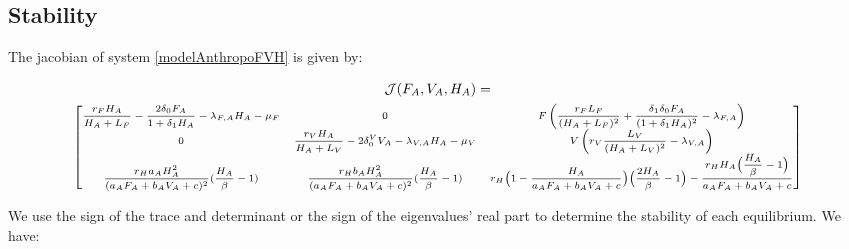 \documentclass{article}
\newcommand{\lfa}{\lambda_{F, A}}
\newcommand{\lva}{\lambda_{V, A}}
\newcommand{\dv}{\delta_0^V}
\begin{document}
\subsection{Stability}

The jacobian of system \eqref{modelAnthropoFVH} is given by:

\begin{multline}
\mathcal{J}(F_A, V_A, H_A) = \\
{\scriptsize
\begin{bmatrix}
\dfrac{r_F H_A}{H_A+L_F}- \dfrac{2\delta_0F_A}{1 + \delta_1 H_A} - \lfa H_A - \mu_F & 0 & F\left( \dfrac{r_F L_F}{(H_A+L_F)^2} + \dfrac{\delta_1 \delta_0 F_A}{(1+\delta_1 H_A)^2} - \lfa \right)\\
0 & \dfrac{r_V H_A}{H_A+L_V}- 2\dv V_A - \lva H_A - \mu_V &  V\left(r_V \dfrac{L_V}{(H_A+L_V)^2} - \lva \right)\\
\dfrac{r_H a_AH_A^2}{(a_AF_A + b_A V_A +c)^2} (\dfrac{H_A}{\beta}-1) & \dfrac{r_H b_AH_A^2}{(a_AF_A + b_A V_A +c)^2} (\dfrac{H_A}{\beta}-1) & r_H\Big(1-\dfrac{H_A}{a_AF_A + b_AV_A +c}\Big)\Big(\dfrac{2H_A}{\beta}-1\Big) - \dfrac{r_H H_A\Big(\dfrac{H_A}{\beta}-1\Big)}{a_AF_A + b_A V_A + c}
\end{bmatrix}}
\end{multline}

We use the sign of the trace and determinant or the sign of the eigenvalues' real part to determine the stability of each equilibrium. We have:
\end{document}
